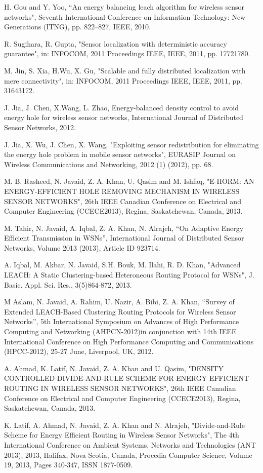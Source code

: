 \documentclass[journal]{IEEEtran}
\begin{document}
\begin{thebibliography}{9}
 H. Gou and Y. Yoo, “An energy balancing leach algorithm for wireless sensor networks", Seventh International Conference on Information Technology: New Generations
(ITNG), pp. 822–827, IEEE, 2010.

 R. Sugihara, R. Gupta, "Sensor localization with deterministic accuracy guarantee",  in: INFOCOM, 2011 Proceedings IEEE, IEEE, 2011, pp. 17721780.

 M. Jin, S. Xia, H.Wu, X. Gu, "Scalable and fully distributed localization with mere connectivity", in: INFOCOM, 2011 Proceedings IEEE, IEEE, 2011, pp. 31643172.

 J. Jia, J. Chen, X.Wang, L. Zhao, Energy-balanced density control to avoid energy hole for wireless sensor networks, International Journal of Distributed Sensor Networks, 2012.

 J. Jia, X. Wu, J. Chen, X. Wang, "Exploiting sensor redistribution for eliminating the energy hole problem in mobile sensor networks", EURASIP Journal on Wireless Communications and Networking, 2012 (1) (2012), pp. 68.

 M. B. Rasheed, N. Javaid, Z. A. Khan, U. Qasim and M. Ishfaq, "E-HORM: AN ENERGY-EFFICIENT HOLE REMOVING MECHANISM IN WIRELESS SENSOR NETWORKS", 26th IEEE Canadian Conference on Electrical and Computer Engineering (CCECE2013), Regina, Saskatchewan, Canada, 2013.

 M. Tahir, N. Javaid, A. Iqbal, Z. A. Khan, N. Alrajeh, “On Adaptive Energy Efficient Transmission in WSNs”, International Journal of Distributed Sensor Networks, Volume 2013 (2013), Article ID 923714.

 A. Iqbal, M. Akbar, N. Javaid, S.H. Bouk, M. Ilahi, R. D. Khan, "Advanced LEACH: A Static Clustering-based Heteroneous Routing Protocol for WSNs", J. Basic. Appl. Sci. Res., 3(5)864-872, 2013.

 M Aslam, N. Javaid, A. Rahim, U. Nazir, A. Bibi, Z. A. Khan, “Survey of Extended LEACH-Based Clustering Routing Protocols for Wireless Sensor Networks”, 5th International Symposium on Advances of High Performance Computing and Networking (AHPCN-2012)in conjunction with 14th IEEE International Conference on High Performance Computing and Communications (HPCC-2012), 25-27 June, Liverpool, UK, 2012.

 A. Ahmad, K. Latif, N. Javaid, Z. A. Khan and U. Qasim, "DENSITY CONTROLLED DIVIDE-AND-RULE SCHEME FOR ENERGY EFFICIENT ROUTING IN WIRELESS SENSOR NETWORKS", 26th IEEE Canadian Conference on Electrical and Computer Engineering (CCECE2013), Regina, Saskatchewan, Canada, 2013.

 K. Latif, A. Ahmad, N. Javaid, Z. A. Khan and N. Alrajeh, "Divide-and-Rule Scheme for Energy Efficient Routing in Wireless Sensor Networks", The 4th International Conference on Ambient Systems, Networks and Technologies (ANT 2013), 2013, Halifax, Nova Scotia, Canada, Procedia Computer Science, Volume 19, 2013, Pages 340-347, ISSN 1877-0509.
\end{thebibliography}
\end{document}
